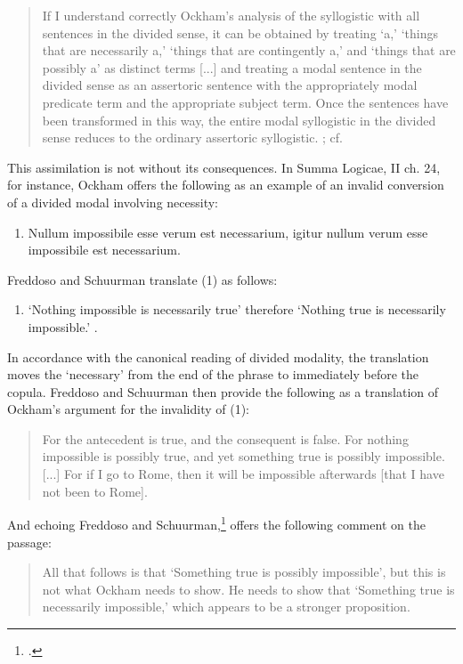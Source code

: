 \documentclass[a4paper]{article}
\begin{document}
\begin{quote}
If I understand correctly Ockham's analysis of the syllogistic with all sentences in the divided sense, it can be obtained by treating `a,' `things that are necessarily a,' `things that are contingently a,' and `things that are possibly a' as distinct terms [...] and treating a modal sentence in the divided sense as an assertoric sentence with the appropriately modal predicate term and the appropriate subject term. Once the sentences have been transformed in this way, the entire modal syllogistic in the divided sense reduces to the ordinary assertoric syllogistic. \cite[p. 49]{Normore1999}; cf. \cite{DutilhNovaes2004}
\end{quote}

This assimilation is not without its consequences. In Summa Logicae, II ch. 24, for instance, Ockham offers the following as an example of an invalid conversion of a divided modal involving necessity: 
\begin{enumerate} 
\item[(1)] Nullum impossibile esse verum est necessarium, igitur nullum verum esse impossibile est necessarium. \cite[p. 298]{OckhamSL2}
\end{enumerate}

\noindent Freddoso and Schuurman translate (1) as follows:
\begin{enumerate}
	\item[(1')]	`Nothing impossible is necessarily true' therefore `Nothing true is necessarily impossible.' \cite[p. 166]{OckhamSLEng}.
\end{enumerate}

\noindent In accordance with the canonical reading of divided modality, the translation moves the `necessary' from the end of the phrase to immediately before the copula. Freddoso and Schuurman then provide the following as a translation of Ockham's argument for the invalidity of (1):
\begin{quote}
For the antecedent is true, and the consequent is false. For nothing impossible is possibly true, and yet something true is possibly impossible. [...] For if I go to Rome, then it will be impossible afterwards [that I have not been to Rome]. \cite[p. 166]{OckhamSLEng}
\end{quote}

And echoing Freddoso and Schuurman,\footnote{\cite[p. 203, fn. 4]{OckhamSLEng}.} \cite{Johnston2015} offers the following comment on the passage: 

\begin{quote}
All that follows is that `Something true is possibly impossible', but this is not what Ockham needs to show. He needs to show that `Something true is necessarily impossible,' which appears to be a stronger proposition.  \cite[p. 243]{Johnston2015}
\end{quote}
\end{document}
